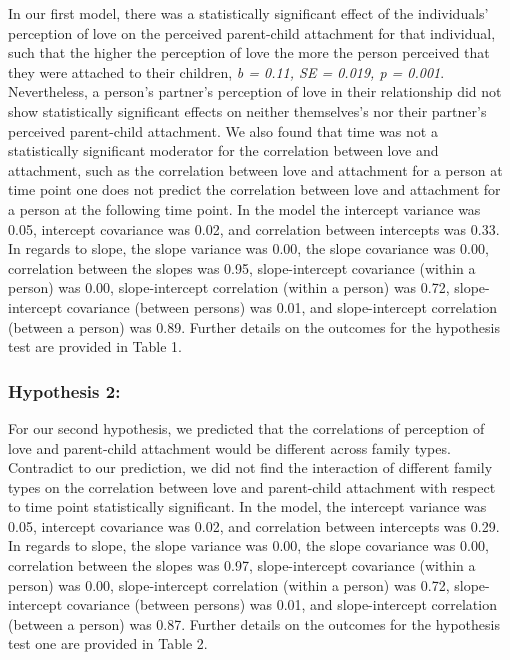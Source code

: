 \documentclass[man]{apa6}
\begin{document}
In our first model, there was a statistically significant effect of the individuals' perception of love on the perceived parent-child attachment for that individual, such that the higher the perception of love the more the person perceived that they were attached to their children, \emph{b = 0.11, SE = 0.019, p = 0.001}. Nevertheless, a person's partner's perception of love in their relationship did not show statistically significant effects on neither themselves's nor their partner's perceived parent-child attachment. We also found that time was not a statistically significant moderator for the correlation between love and attachment, such as the correlation between love and attachment for a person at time point one does not predict the correlation between love and attachment for a person at the following time point. In the model the intercept variance was 0.05, intercept covariance was 0.02, and correlation between intercepts was 0.33. In regards to slope, the slope variance was 0.00, the slope covariance was 0.00, correlation between the slopes was 0.95, slope-intercept covariance (within a person) was 0.00, slope-intercept correlation (within a person) was 0.72, slope-intercept covariance (between persons) was 0.01, and slope-intercept correlation (between a person) was 0.89. Further details on the outcomes for the hypothesis test are provided in Table 1.

\hypertarget{hypothesis-2}{%
\subsubsection{Hypothesis 2:}\label{hypothesis-2}}

For our second hypothesis, we predicted that the correlations of perception of love and parent-child attachment would be different across family types. Contradict to our prediction, we did not find the interaction of different family types on the correlation between love and parent-child attachment with respect to time point statistically significant. In the model, the intercept variance was 0.05, intercept covariance was 0.02, and correlation between intercepts was 0.29. In regards to slope, the slope variance was 0.00, the slope covariance was 0.00, correlation between the slopes was 0.97, slope-intercept covariance (within a person) was 0.00, slope-intercept correlation (within a person) was 0.72, slope-intercept covariance (between persons) was 0.01, and slope-intercept correlation (between a person) was 0.87. Further details on the outcomes for the hypothesis test one are provided in Table 2.
\end{document}
